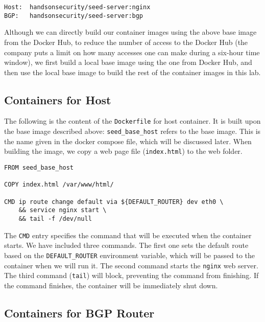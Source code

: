 \begin{lstlisting}
Host:  handsonsecurity/seed-server:nginx
BGP:   handsonsecurity/seed-server:bgp
\end{lstlisting}


Although we can directly build our container images using 
the above base image from the Docker Hub, to reduce
the number of access to the Docker Hub (the company
puts a limit on how many accesses one can make 
during a six-hour time window), we first build a 
local base image using the one from Docker Hub, and then
use the local base image to build the rest of the 
container images in this lab. 
 

\subsection{Containers for Host} 

The following is the content of the \texttt{Dockerfile} for 
host container. It is built upon the base image 
described above: \texttt{seed\_base\_host} refers to the 
base image. This is the name given in 
the docker compose file, which will be discussed later.
When building the image, we copy a web page file (\texttt{index.html}) 
to the web folder. 

\begin{lstlisting}
FROM seed_base_host

COPY index.html /var/www/html/

CMD ip route change default via ${DEFAULT_ROUTER} dev eth0 \
    && service nginx start \
    && tail -f /dev/null
\end{lstlisting}


The \texttt{CMD} entry specifies the command that will be 
executed when the container starts. We have included 
three commands. The first one sets the default route based
on the \texttt{DEFAULT\_ROUTER} environment variable, 
which will be passed to the container when we will 
run it. The second command starts the \texttt{nginx}
web server. 
The third command (\texttt{tail})
will block, preventing the command from finishing. 
If the command finishes, the container will be 
immediately shut down. 



\subsection{Containers for BGP Router}

